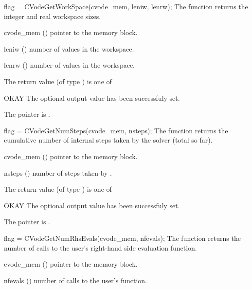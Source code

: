 {}
{
  flag = CVodeGetWorkSpace(cvode\_mem, leniw, lenrw);
}
{
  The function  returns the
  {\cvodes} integer and real workspace sizes.
}
{
  \begin{args}
  \item[cvode\_mem] ()
    pointer to the {\cvodes} memory block.
  \item[leniw] ()
    number of  values in the {\cvodes} workspace.
  \item[lenrw] ()
    number of  values in the {\cvodes} workspace.
  \end{args}
}
{
  The return value  (of type ) is one of
  \begin{args}
  \item[OKAY] 
    The optional output value has been successfuly set.
  \item[\Id{CVG\_NO\_MEM}]
    The  pointer is .
  \end{args}
}
{}
{
  flag = CVodeGetNumSteps(cvode\_mem, nsteps);
}
{
  The function  returns the cumulative number of internal 
  steps taken by the solver (total so far).
}
{
  \begin{args}
  \item[cvode\_mem] ()
    pointer to the {\cvodes} memory block.
  \item[nsteps] ()
    number of steps taken by {\cvodes}.
  \end{args}
}
{
  The return value  (of type ) is one of
  \begin{args}
  \item[OKAY] 
    The optional output value has been successfuly set.
  \item[\Id{CVG\_NO\_MEM}]
    The  pointer is .
  \end{args}
}
{}
{
  flag = CVodeGetNumRhsEvals(cvode\_mem, nfevals);
}
{
  The function  returns the 
  number of calls to the user's right-hand side evaluation function.
}
{
  \begin{args}
  \item[cvode\_mem] ()
    pointer to the {\cvodes} memory block.
  \item[nfevals] ()
    number of calls to the user's  function.
  \end{args}
}
